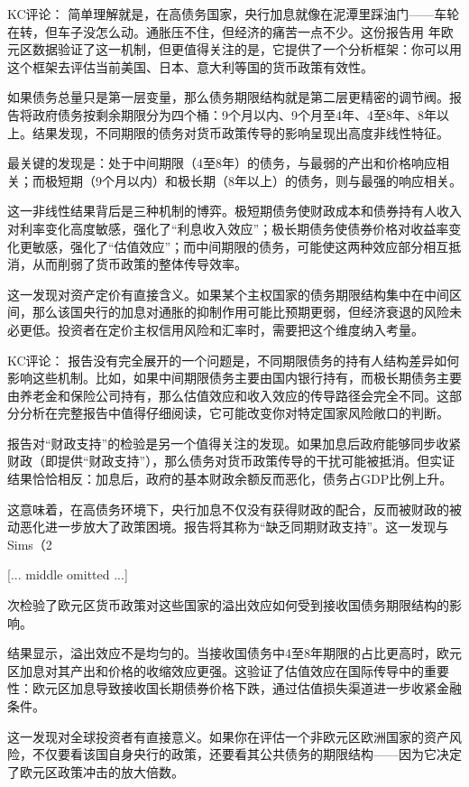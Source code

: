 \documentclass[11pt]{ctexart}
\begin{document}
KC评论： 简单理解就是，在高债务国家，央行加息就像在泥潭里踩油门——车轮在转，但车子没怎么动。通胀压不住，但经济的痛苦一点不少。这份报告用 年欧元区数据验证了这一机制，但更值得关注的是，它提供了一个分析框架：你可以用这个框架去评估当前美国、日本、意大利等国的货币政策有效性。

如果债务总量只是第一层变量，那么债务期限结构就是第二层更精密的调节阀。报告将政府债务按剩余期限分为四个桶：9个月以内、9个月至4年、4至8年、8年以上。结果发现，不同期限的债务对货币政策传导的影响呈现出高度非线性特征。

最关键的发现是：处于中间期限（4至8年）的债务，与最弱的产出和价格响应相关；而极短期（9个月以内）和极长期（8年以上）的债务，则与最强的响应相关。

这一非线性结果背后是三种机制的博弈。极短期债务使财政成本和债券持有人收入对利率变化高度敏感，强化了“利息收入效应”；极长期债务使债券价格对收益率变化更敏感，强化了“估值效应”；而中间期限的债务，可能使这两种效应部分相互抵消，从而削弱了货币政策的整体传导效率。

这一发现对资产定价有直接含义。如果某个主权国家的债务期限结构集中在中间区间，那么该国央行的加息对通胀的抑制作用可能比预期更弱，但经济衰退的风险未必更低。投资者在定价主权信用风险和汇率时，需要把这个维度纳入考量。

KC评论： 报告没有完全展开的一个问题是，不同期限债务的持有人结构差异如何影响这些机制。比如，如果中间期限债务主要由国内银行持有，而极长期债务主要由养老金和保险公司持有，那么估值效应和收入效应的传导路径会完全不同。这部分分析在完整报告中值得仔细阅读，它可能改变你对特定国家风险敞口的判断。

报告对“财政支持”的检验是另一个值得关注的发现。如果加息后政府能够同步收紧财政（即提供“财政支持”），那么债务对货币政策传导的干扰可能被抵消。但实证结果恰恰相反：加息后，政府的基本财政余额反而恶化，债务占GDP比例上升。

这意味着，在高债务环境下，央行加息不仅没有获得财政的配合，反而被财政的被动恶化进一步放大了政策困境。报告将其称为“缺乏同期财政支持”。这一发现与Sims（2

[... middle omitted ...]

次检验了欧元区货币政策对这些国家的溢出效应如何受到接收国债务期限结构的影响。

结果显示，溢出效应不是均匀的。当接收国债务中4至8年期限的占比更高时，欧元区加息对其产出和价格的收缩效应更强。这验证了估值效应在国际传导中的重要性：欧元区加息导致接收国长期债券价格下跌，通过估值损失渠道进一步收紧金融条件。

这一发现对全球投资者有直接意义。如果你在评估一个非欧元区欧洲国家的资产风险，不仅要看该国自身央行的政策，还要看其公共债务的期限结构——因为它决定了欧元区政策冲击的放大倍数。
\end{document}
